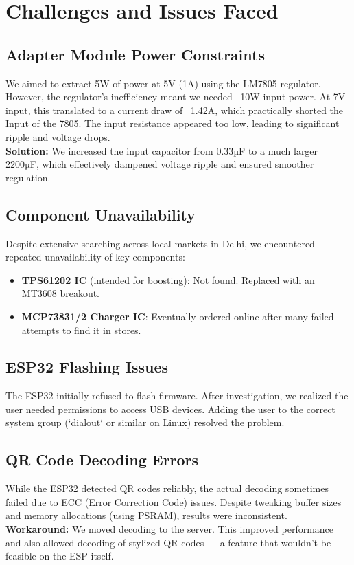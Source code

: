 \chapter{Challenges and Issues Faced}

\section{Adapter Module Power Constraints}

We aimed to extract 5W of power at 5V (1A) using the LM7805 regulator. However, the regulator's inefficiency meant we needed ~10W input power. At 7V input, this translated to a current draw of ~1.42A, which practically shorted the Input of the 7805. The input resistance appeared too low, leading to significant ripple and voltage drops.\\

\textbf{Solution:} We increased the input capacitor from 0.33µF to a much larger 2200µF, which effectively dampened voltage ripple and ensured smoother regulation.

\section{Component Unavailability}

Despite extensive searching across local markets in Delhi, we encountered repeated unavailability of key components:

\begin{itemize}
    \item \textbf{TPS61202 IC} (intended for boosting): Not found. Replaced with an MT3608 breakout.
    \item \textbf{MCP73831/2 Charger IC}: Eventually ordered online after many failed attempts to find it in stores.
\end{itemize}

\section{ESP32 Flashing Issues}

The ESP32 initially refused to flash firmware. After investigation, we realized the user needed permissions to access USB devices. Adding the user to the correct system group (`dialout` or similar on Linux) resolved the problem.

\section{QR Code Decoding Errors}

While the ESP32 detected QR codes reliably, the actual decoding sometimes failed due to ECC (Error Correction Code) issues. Despite tweaking buffer sizes and memory allocations (using PSRAM), results were inconsistent.\\

\textbf{Workaround:} We moved decoding to the server. This improved performance and also allowed decoding of stylized QR codes — a feature that wouldn’t be feasible on the ESP itself.
